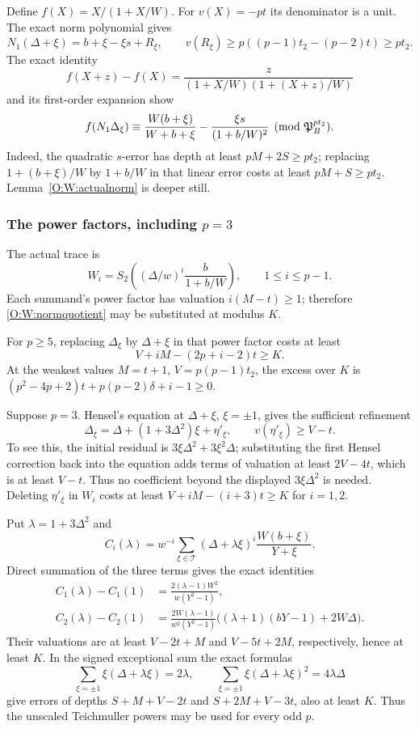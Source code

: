 \documentclass[11pt]{amsart}
\theoremstyle{definition}
\theoremstyle{remark}
\begin{document}
Define $f(X)=X/(1+X/W)$. For $v(X)=-pt$ its denominator is a unit.
The exact norm polynomial gives
\[
 N_1(\Delta+\xi)=b+\xi-\xi s+R_\xi,
 \qquad v(R_\xi)\ge p((p-1)t_2-(p-2)t)\ge pt_2.
\]
The exact identity
\[
 f(X+z)-f(X)=\frac{z}{(1+X/W)(1+(X+z)/W)}
\]
and its first-order expansion show
\begin{equation}\label{O:W:normquotient}
 f(N_1\Delta_\xi)\equiv
 \frac{W(b+\xi)}{W+b+\xi}-\frac{\xi s}{(1+b/W)^2}
 \pmod{\mathfrak P_B^{pt_2}}.
\end{equation}
Indeed, the quadratic $s$-error has depth at least $pM+2S\ge pt_2$;
replacing $1+(b+\xi)/W$ by $1+b/W$ in that linear error costs at
least $pM+S\ge pt_2$. Lemma~\ref{O:W:actualnorm} is deeper still.

\subsubsection*{\texorpdfstring{The power factors, including $p=3$}{The power factors, including p=3}}
The actual trace is
\[
 W_i=S_2\left((\Delta/w)^i\frac{b}{1+b/W}\right),\qquad1\le i\le p-1.
\]
Each summand's power factor has valuation $i(M-t)\ge1$; therefore
\eqref{O:W:normquotient} may be substituted at modulus $K$.

For $p\ge5$, replacing $\Delta_\xi$ by $\Delta+\xi$ in that power
factor costs at least
\[
 V+iM-(2p+i-2)t\ge K.
\]
At the weakest values $M=t+1$, $V=p(p-1)t_2$, the excess over $K$
is $(p^2-4p+2)t+p(p-2)\delta+i-1\ge0$.

Suppose $p=3$. Hensel's equation at $\Delta+\xi$, $\xi=\pm1$,
gives the sufficient refinement
\begin{equation}\label{O:W:p3root}
 \Delta_\xi=\Delta+(1+3\Delta^2)\xi+\eta'_\xi,
 \qquad v(\eta'_\xi)\ge V-t.
\end{equation}
To see this, the initial residual is
$3\xi\Delta^2+3\xi^2\Delta$; substituting the first Hensel correction
back into the equation adds terms of valuation at least $2V-4t$,
which is at least $V-t$. Thus no coefficient beyond the displayed
$3\xi\Delta^2$ is needed. Deleting $\eta'_\xi$ in $W_i$ costs at
least $V+iM-(i+3)t\ge K$ for $i=1,2$.

Put $\lambda=1+3\Delta^2$ and
\[
 C_i(\lambda)=w^{-i}\sum_{\xi\in\mathcal T}
 (\Delta+\lambda\xi)^i\frac{W(b+\xi)}{Y+\xi}.
\]
Direct summation of the three terms gives the exact identities
\begin{align*}
 C_1(\lambda)-C_1(1)&=
 \frac{2(\lambda-1)W^2}{w(Y^2-1)},\\
 C_2(\lambda)-C_2(1)&=
 \frac{2W(\lambda-1)}{w^2(Y^2-1)}
 \bigl((\lambda+1)(bY-1)+2W\Delta\bigr).
\end{align*}
Their valuations are at least $V-2t+M$ and $V-5t+2M$, respectively,
hence at least $K$. In the signed exceptional sum the exact formulas
\[
 \sum_{\xi=\pm1}\xi(\Delta+\lambda\xi)=2\lambda,
 \qquad \sum_{\xi=\pm1}\xi(\Delta+\lambda\xi)^2=4\lambda\Delta
\]
give errors of depths $S+M+V-2t$ and $S+2M+V-3t$, also at least $K$.
Thus the unscaled Teichmuller powers may be used for every odd $p$.
\end{document}
